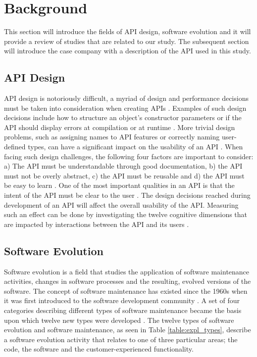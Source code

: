 \documentclass{sig-alternate}
\begin{document}
\section{Background} \label{background}
This section will introduce the fields of API design, software evolution and it will provide a review of studies that are related to our study. The subsequent section will introduce the case company with a description of the API used in this study.  

\subsection{API Design} \label{api_design}

API design is notoriously difficult, a myriad of design and performance decisions must be taken into consideration when creating APIs \cite{afonso2012evaluating, bloch2008effective, stylos2006comparing}. Examples of such design decisions include how to structure an object's constructor parameters or if the API should display errors at compilation or at runtime \cite{stylos2006comparing}. More trivial design problems, such as assigning names to API features or correctly naming user-defined types, can have a significant impact on the usability of an API \cite{shi2011empirical}. When facing such design challenges, the following four factors are important to consider: a) The API must be understandable through good documentation, b) the API must not be overly abstract, c) the API must be reusable and d) the API must be easy to learn \cite{shi2011empirical}. One of the most important qualities in an API is that the intent of the API must be clear to the user \cite{shi2011empirical, stylos2006comparing}. The design decisions reached during development of an API will affect the overall usability of the API. Measuring such an effect can be done by investigating the twelve cognitive dimensions that are impacted by interactions between the API and its users \cite{clarke2004measuring}. 


\subsection{Software Evolution} \label{software_evolution}
Software evolution is a field that studies the application of software maintenance activities, changes in software processes and the resulting, evolved versions of the software. The concept of software maintenance has existed since the 1960s when it was first introduced to the software development community \cite{lientz1980software}. A set of four categories describing different types of software maintenance \cite{lientz1980software} became the basis upon which twelve new types were developed \cite{chapin2001types}. The twelve types of software evolution and software maintenance, as seen in Table \ref{table:expl_types}, describe a software evolution activity that relates to one of three particular areas; the code, the software and the customer-experienced functionality. 
\end{document}
